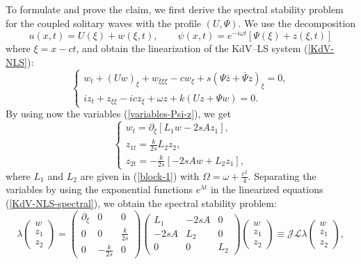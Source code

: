 \documentclass[12pt,reqno]{amsart}
\numberwithin{equation}{section}
\begin{document}
To formulate and prove the claim, we first derive the spectral stability 
problem for the coupled solitary waves with the profile $(U,\Psi)$. 
We use the decomposition 
$$
u(x,t) = U(\xi) + w(\xi,t), \qquad 
\psi(x,t) = e^{-i \omega t} [ \Psi(\xi) + z(\xi,t) ]
$$ 
where $\xi = x - ct$, and obtain the linearization of 
the KdV--LS system (\ref{KdV-NLS}):
\begin{equation}
    \label{KdV-NLS-lin}
\begin{cases}
    w_{t} +  (U w)_{\xi} + w_{\xi \xi \xi} - c w_{\xi} +s (\Psi \bar{z} + \bar{\Psi} z)_{\xi}=0, \\
 i z_{t} + z_{\xi \xi} - i c z_{\xi} + \omega z + k (U z + \Psi w) =0.
\end{cases}
\end{equation}
By using now the variables (\ref{variables-Psi-z}), we get 
\begin{equation}
    \label{KdV-NLS-spectral}
\begin{cases}
    w_{t} = \partial_{\xi} \left[ L_1 w - 2 s A z_1 \right], \\
    z_{1t} = \frac{k}{2 s } L_2 z_2, \\
    z_{2t} = -\frac{k}{2 s } \left[ -2 s A w + L_2 z_1 \right],
\end{cases}
\end{equation}
where $L_1$ and $L_2$ are given in (\ref{block-1}) with $\Omega = \omega + \frac{c^2}{4}$. Separating the variables by using the exponential functions 
$e^{\lambda t}$ in the linearized equations (\ref{KdV-NLS-spectral}), we obtain the spectral stability problem:
\begin{equation}
    \label{KdV-NLS-stability}
\lambda \begin{pmatrix} w \\ z_1 \\ z_2 \end{pmatrix} = \begin{pmatrix} \partial_{\xi} & 0 & 0 \\ 0 & 0 & \frac{k}{2s} \\ 0 & -\frac{k}{2s} & 0 \end{pmatrix} 
\begin{pmatrix} L_1 & -2 s A & 0 \\ -2 s A & L_2 & 0 \\ 0 & 0 & L_2 \end{pmatrix} \begin{pmatrix} w \\ z_1 \\ z_2 \end{pmatrix} \equiv \mathcal{J} \mathcal{L} \lambda \begin{pmatrix} w \\ z_1 \\ z_2 \end{pmatrix},
\end{equation}
\end{document}
